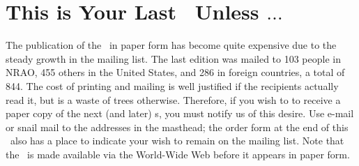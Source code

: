 

\newcommand{\AMark}{AIPSMark$^{(93)}$}
\newcommand{\AMarks}{AIPSMarks$^{(93)}$}
\newcommand{\LMark}{AIPSLoopMark$^{(93)}$}
\newcommand{\LMarks}{AIPSLoopMarks$^{(93)}$}
\newcommand{\AM}{A_m^{(93)}}
\newcommand{\ALM}{AL_m^{(93)}}

\newcommand{\AIPRELEASE}{January 15, 1996}
\newcommand{\AIPVOLUME}{Volume XVI}
\newcommand{\AIPNUMBER}{Number 1}
\newcommand{\RELEASENAME}{{\tt 15JAN96}}
\newcommand{\OLDNAME}{{\tt 15JUL95}}




\newcommand{\MYSpace}{-11pt}

\normalstyle

\section{This is Your Last \Aipsletter\ Unless $\ldots$}

The publication of the \Aipsletter\ in paper form has become quite
expensive due to the steady growth in the mailing list.  The last
edition was mailed to 103 people in NRAO, 455 others in the United
States, and 286 in foreign countries, a total of 844.  The cost of
printing and mailing is well justified if the recipients actually read
it, but is a waste of trees otherwise.  Therefore, if you wish to
to receive a paper copy of the next (and later) \Aipsletter s, you
must notify us of this desire.  Use e-mail or snail mail to the
addresses in the masthead; the order form at the end of this
\Aipsletter\ also has a place to indicate your wish to remain on the
mailing list.  Note that the \Aipsletter\ is made available via the
World-Wide Web before it appears in paper form.


